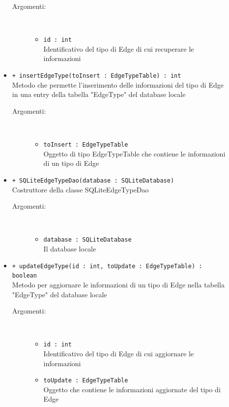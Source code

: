 \documentclass[../DefinizioneDiProdotto.tex]{subfiles}
\begin{document}
\begin{description}
\begin{itemize}
 \begin{description}
\item[Argomenti:] \
\begin{itemize}
\item \texttt{id : int}\\
Identificativo del tipo di Edge di cui recuperare le informazioni\end{itemize}
\end{description}
\item \texttt{+ insertEdgeType(toInsert : EdgeTypeTable) : int}\\
Metodo che permette l'inserimento delle informazioni del tipo di Edge in una entry della tabella "EdgeType" del database locale
 \begin{description}
\item[Argomenti:] \
\begin{itemize}
\item \texttt{toInsert : EdgeTypeTable}\\
Oggetto di tipo EdgeTypeTable che contiene le informazioni di un tipo di Edge\end{itemize}
\end{description}
\item \texttt{+ SQLiteEdgeTypeDao(database : SQLiteDatabase)}\\
Costruttore della classe SQLiteEdgeTypeDao
 \begin{description}
\item[Argomenti:] \
\begin{itemize}
\item \texttt{database : SQLiteDatabase}\\
Il database locale\end{itemize}
\end{description}
\item \texttt{+ updateEdgeType(id : int, toUpdate : EdgeTypeTable) : boolean}\\
Metodo per aggiornare le informazioni di un tipo di Edge nella tabella "EdgeType" del database locale
 \begin{description}
\item[Argomenti:] \
\begin{itemize}
\item \texttt{id : int}\\
Identificativo del tipo di Edge di cui aggiornare le informazioni\item \texttt{toUpdate : EdgeTypeTable}\\
Oggetto che contiene le informazioni aggiornate del tipo di Edge\end{itemize}
\end{description}
\end{itemize}
\end{description}
\end{document}
